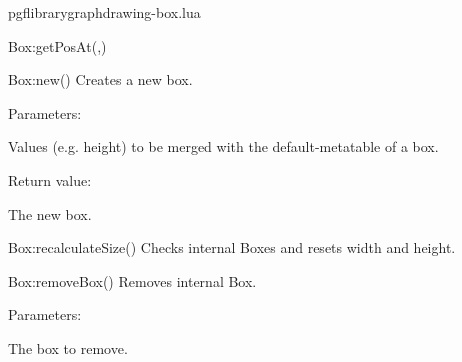 \begin{filedescription}{pgflibrarygraphdrawing-box.lua}
\begin{luacommand}{{Box:getPosAt}(,)}
\end{luacommand}
\begin{luacommand}{{Box:new}()}
Creates a new box.

Parameters:
\begin{parameterdescription}
	\item[\meta{values}] Values (e.g. height) to be merged with the default-metatable of a box.
\end{parameterdescription}


Return value:
\begin{parameterdescription} 
  \item[] The new box.
\end{parameterdescription}


\end{luacommand}
\begin{luacommand}{{Box:recalculateSize}()}
Checks internal Boxes and resets width and height.



\end{luacommand}
\begin{luacommand}{{Box:removeBox}()}
Removes internal Box.

Parameters:
\begin{parameterdescription}
	\item[\meta{box}] The box to remove.
\end{parameterdescription}



\end{luacommand}

\end{filedescription}